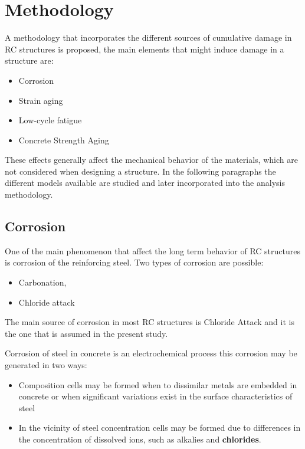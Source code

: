 \chapter{Methodology}

A methodology that incorporates the different sources of cumulative damage in RC structures is proposed, the main elements that might induce damage in a structure are:

\begin{itemize}
	\item Corrosion
	\item Strain aging
	\item Low-cycle fatigue
	\item Concrete Strength Aging
\end{itemize}

These effects generally affect the mechanical behavior of the materials, which are not considered when designing a structure. In the following paragraphs the different models available are studied and later incorporated into the analysis methodology.

\section{Corrosion}

One of the main phenomenon that affect the long term behavior of RC structures is corrosion of the reinforcing steel. Two types of corrosion are possible:
\begin{itemize}
		\item Carbonation, 
		\item Chloride attack
\end{itemize}

The main source of corrosion in most RC structures is Chloride Attack and it is the one that is assumed in the present study.

Corrosion of steel in concrete is an electrochemical process \cite{Mehta2014} this corrosion may be generated in two ways:
\begin{itemize}
	\item Composition cells may be formed when to dissimilar metals are embedded in concrete or when significant variations exist in the surface characteristics of steel
	\item In the vicinity of steel concentration cells may be formed due to differences in the concentration of dissolved ions, such as alkalies and \textbf{chlorides}.
\end{itemize}

